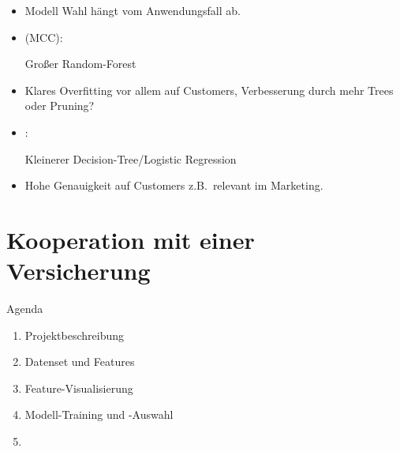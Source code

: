 \begin{frame}
\centering
{}
{
\begin{itemize}
\item Modell Wahl hängt vom Anwendungsfall ab.
\item {} (MCC):

 Großer Random-Forest

\item Klares Overfitting vor allem auf Customers, Verbesserung durch mehr Trees oder Pruning? 
 
\item {}:

Kleinerer Decision-Tree/Logistic Regression
\item Hohe Genauigkeit auf Customers z.B.\ relevant im Marketing.
\end{itemize}
}
\end{frame}

\section{Kooperation mit einer Versicherung}

\begin{frame}{Agenda}
\centering
\myBlock[0.6]{}
{
\begin{enumerate}
\item Projektbeschreibung
\item Datenset und Features
\item Feature-Visualisierung
\item Modell-Training und -Auswahl
\item {}
\end{enumerate}
}
\end{frame}

